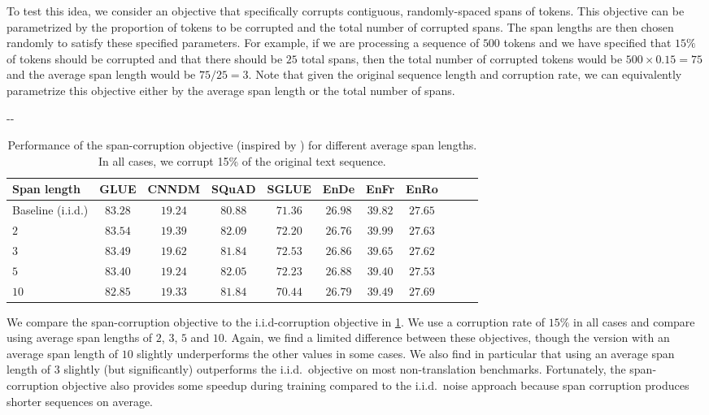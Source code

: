\documentclass[twoside,11pt]{article}
\newlength{\offsetpage}
\newenvironment{widepage}{\begin{adjustwidth}{-\offsetpage}{-\offsetpage}
    \addtolength{\textwidth}{2\offsetpage}}
{\end{adjustwidth}}
\newcommand{\bsl}{\makebox[0pt][r]{\raisebox{0.05em}{$\bigstar\,$}}}
\def\*#1{\mathbf{#1}}
\begin{document}
To test this idea, we consider an objective that specifically corrupts contiguous, randomly-spaced spans of tokens.
This objective can be parametrized by the proportion of tokens to be corrupted and the total number of corrupted spans.
The span lengths are then chosen randomly to satisfy these specified parameters.
For example, if we are processing a sequence of $500$ tokens and we have specified that $15\%$ of tokens should be corrupted and that there should be $25$ total spans, then the total number of corrupted tokens would be $500 \times 0.15 = 75$ and the average span length would be $75 / 25 = 3$.
Note that given the original sequence length and corruption rate, we can equivalently parametrize this objective either by the average span length or the total number of spans.
\begin{table}
\footnotesize
\begin{widepage}
\centering
\begin{tabular}{l c c c c c c c c c c}
\toprule
    Span length            & GLUE        & CNNDM       & SQuAD       & SGLUE       & EnDe        & EnFr        & EnRo    \\
\midrule
    \bsl Baseline (i.i.d.) & $\*{83.28}$ & $19.24$     & $80.88$     & $71.36$     & $\*{26.98}$ & $\*{39.82}$ & $\*{27.65}$ \\
    $2$                    & $\*{83.54}$ & $19.39$     & $\*{82.09}$ & $\*{72.20}$ & $\*{26.76}$ & $\*{39.99}$ & $\*{27.63}$ \\
    $3$                    & $\*{83.49}$ & $\*{19.62}$ & $\*{81.84}$ & $\*{72.53}$ & $\*{26.86}$ & $39.65$     & $\*{27.62}$ \\
    $5$                    & $\*{83.40}$ & $19.24$     & $\*{82.05}$ & $\*{72.23}$ & $\*{26.88}$ & $39.40$     & $\*{27.53}$ \\
    $10$                   & $82.85$     & $19.33$     & $\*{81.84}$ & $70.44$     & $\*{26.79}$ & $39.49$     & $\*{27.69}$ \\
\bottomrule
\end{tabular}
\end{widepage}
\caption{
Performance of the span-corruption objective (inspired by \cite{joshi2019spanbert}) for different average span lengths.
In all cases, we corrupt 15\% of the original text sequence.
}
\label{tab:objectives_span}
\end{table}

We compare the span-corruption objective to the i.i.d-corruption objective in \cref{tab:objectives_span}.
We use a corruption rate of $15\%$ in all cases and compare using average span lengths of $2$, $3$, $5$ and $10$.
Again, we find a limited difference between these objectives, though the version with an average span length of $10$ slightly underperforms the other values in some cases.
We also find in particular that using an average span length of $3$ slightly (but significantly) outperforms the i.i.d.\ objective on most non-translation benchmarks.
Fortunately, the span-corruption objective also provides some speedup during training compared to the i.i.d.\ noise approach because span corruption produces shorter sequences on average.
\end{document}
